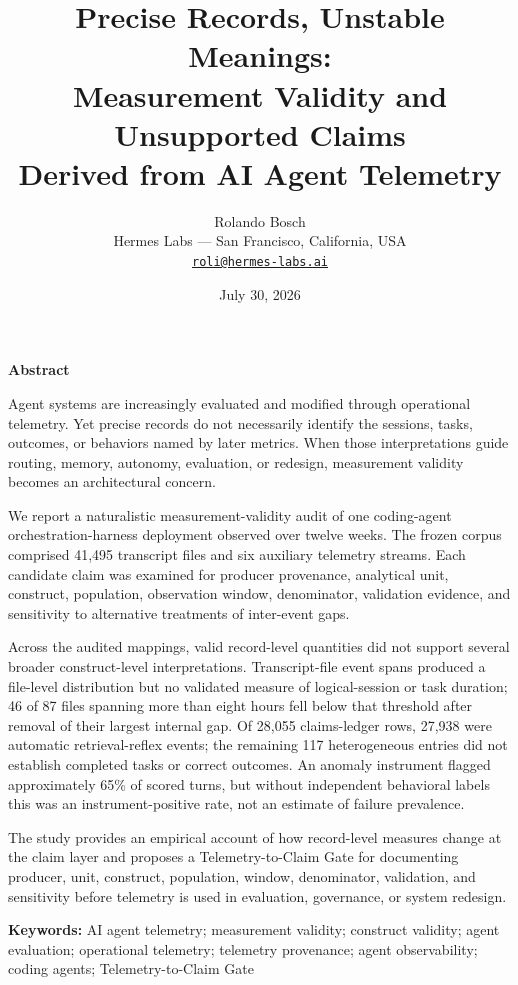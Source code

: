 \documentclass[12pt]{article}
\title{Precise Records, Unstable Meanings:\\Measurement Validity and Unsupported Claims\\Derived from AI Agent Telemetry}
\author{Rolando Bosch\\
Hermes Labs --- San Francisco, California, USA\\
\href{mailto:roli@hermes-labs.ai}{\texttt{roli@hermes-labs.ai}}}
\date{July 30, 2026}
\renewenvironment{abstract}
  {\par\small\begin{center}\bfseries\abstractname\end{center}\vspace{-0.45em}}
  {\par\normalsize}
\begin{document}
\maketitle

\thispagestyle{empty}
\renewcommand{\abstractname}{Abstract}
\begin{abstract}
\setlength{\parskip}{0.25em}
\begin{list}{}{\setlength{\leftmargin}{0.30in}\setlength{\rightmargin}{0.30in}}\item[]
Agent systems are increasingly evaluated and modified through operational telemetry. Yet precise records do not necessarily identify the sessions, tasks, outcomes, or behaviors named by later metrics. When those interpretations guide routing, memory, autonomy, evaluation, or redesign, measurement validity becomes an architectural concern.

We report a naturalistic measurement-validity audit of one coding-agent orchestration-harness deployment observed over twelve weeks. The frozen corpus comprised 41,495 transcript files and six auxiliary telemetry streams. Each candidate claim was examined for producer provenance, analytical unit, construct, population, observation window, denominator, validation evidence, and sensitivity to alternative treatments of inter-event gaps.

Across the audited mappings, valid record-level quantities did not support several broader construct-level interpretations. Transcript-file event spans produced a file-level distribution but no validated measure of logical-session or task duration; 46 of 87 files spanning more than eight hours fell below that threshold after removal of their largest internal gap. Of 28,055 claims-ledger rows, 27,938 were automatic retrieval-reflex events; the remaining 117 heterogeneous entries did not establish completed tasks or correct outcomes. An anomaly instrument flagged approximately 65\% of scored turns, but without independent behavioral labels this was an instrument-positive rate, not an estimate of failure prevalence.

The study provides an empirical account of how record-level measures change at the claim layer and proposes a Telemetry-to-Claim Gate for documenting producer, unit, construct, population, window, denominator, validation, and sensitivity before telemetry is used in evaluation, governance, or system redesign.

\vspace{0.35em}\noindent\textbf{Keywords:} AI agent telemetry; measurement validity; construct validity; agent evaluation; operational telemetry; telemetry provenance; agent observability; coding agents; Telemetry-to-Claim Gate
\end{list}
\end{abstract}
\end{document}
